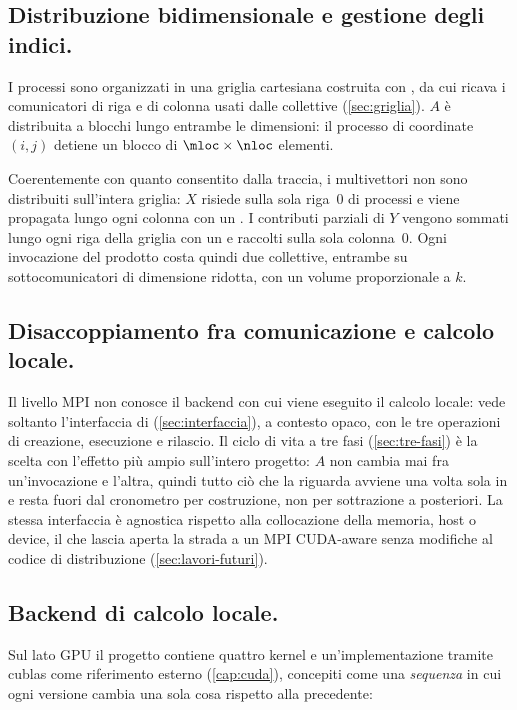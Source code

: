 \subsection{Distribuzione bidimensionale e gestione degli indici.}
I processi sono organizzati in una griglia cartesiana costruita con
, da cui  ricava i comunicatori di
riga e di colonna usati dalle collettive (\cref{sec:griglia}). $A$ è
distribuita a blocchi lungo entrambe le dimensioni: il processo di coordinate
$(i,j)$ detiene un blocco di $\mloc \times \nloc$ elementi.

Coerentemente con quanto consentito dalla traccia, i multivettori non sono
distribuiti sull'intera griglia: $X$ risiede sulla sola riga~0 di processi e
viene propagata lungo ogni colonna con un . I contributi
parziali di $Y$ vengono sommati lungo ogni riga della griglia con un
 e raccolti sulla sola colonna~0. Ogni invocazione del
prodotto costa quindi due collettive, entrambe su sottocomunicatori di
dimensione ridotta, con un volume proporzionale a $k$.

\subsection{Disaccoppiamento fra comunicazione e calcolo locale.}
Il livello MPI non conosce il backend con cui viene eseguito il calcolo locale:
vede soltanto l'interfaccia  di 
(\cref{sec:interfaccia}), a contesto opaco, con le tre operazioni di creazione,
esecuzione e rilascio. Il ciclo di vita a tre fasi (\cref{sec:tre-fasi}) è
la scelta con l'effetto più ampio sull'intero progetto: $A$ non cambia mai fra
un'invocazione e l'altra, quindi tutto ciò che la riguarda avviene una volta sola in
 e resta fuori dal cronometro per costruzione, non per
sottrazione a posteriori. La stessa interfaccia è agnostica rispetto alla
collocazione della memoria, host o device, il che lascia aperta la strada a un
MPI CUDA-aware senza modifiche al codice di distribuzione
(\cref{sec:lavori-futuri}).

\subsection{Backend di calcolo locale.}



Sul lato GPU il progetto contiene quattro kernel e un'implementazione tramite cublas come riferimento esterno (\cref{cap:cuda}),
concepiti come una \emph{sequenza} in
cui ogni versione cambia una sola cosa rispetto alla precedente:

